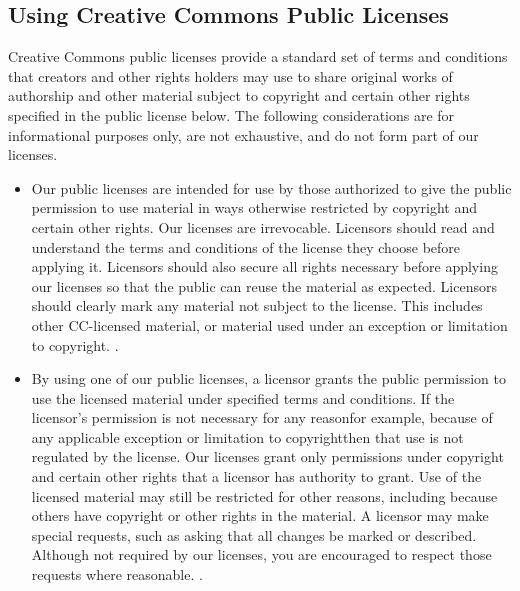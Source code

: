 \documentclass[a4paper,10pt,english]{sphinxmanual}
\begin{document}
\subsection{Using Creative Commons Public Licenses}
\label{\detokenize{license:using-creative-commons-public-licenses}}
Creative Commons public licenses provide a standard set of terms and conditions that creators and other rights holders may use to share original works of authorship and other material subject to copyright and certain other rights specified in the public license below. The following considerations are for informational purposes only, are not exhaustive, and do not form part of our licenses.
\begin{itemize}
\item {} 
 Our public licenses are intended for use by those authorized to give the public permission to use material in ways otherwise restricted by copyright and certain other rights. Our licenses are irrevocable. Licensors should read and understand the terms and conditions of the license they choose before applying it. Licensors should also secure all rights necessary before applying our licenses so that the public can reuse the material as expected. Licensors should clearly mark any material not subject to the license. This includes other CC-licensed material, or material used under an exception or limitation to copyright. .

\item {} 
 By using one of our public licenses, a licensor grants the public permission to use the licensed material under specified terms and conditions. If the licensor’s permission is not necessary for any reason\textendash{}for example, because of any applicable exception or limitation to copyright\textendash{}then that use is not regulated by the license. Our licenses grant only permissions under copyright and certain other rights that a licensor has authority to grant. Use of the licensed material may still be restricted for other reasons, including because others have copyright or other rights in the material. A licensor may make special requests, such as asking that all changes be marked or described. Although not required by our licenses, you are encouraged to respect those requests where reasonable. .

\end{itemize}
\end{document}
